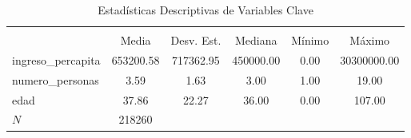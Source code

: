 \begin{table}[htbp]\centering
\def\sym#1{\ifmmode^{#1}\else\(^{#1}\)\fi}
\caption{Estadísticas Descriptivas de Variables Clave}
\begin{tabular}{l*{1}{ccccc}}
\toprule
            &\multicolumn{5}{c}{}                                            \\
            &       Media&  Desv. Est.&     Mediana&      Mínimo&      Máximo\\
\midrule
ingreso\_percapita&   653200.58&   717362.95&   450000.00&        0.00& 30300000.00\\
numero\_personas&        3.59&        1.63&        3.00&        1.00&       19.00\\
edad        &       37.86&       22.27&       36.00&        0.00&      107.00\\
\midrule
\(N\)       &      218260&            &            &            &            \\
\bottomrule
\end{tabular}
\end{table}

